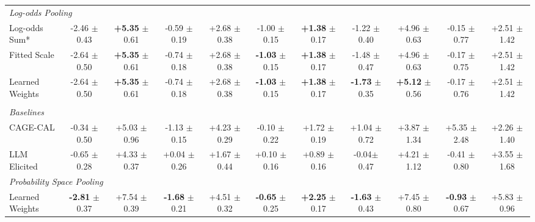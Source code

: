 \begin{table}[t]
\begin{threeparttable}
{\begin{tabular}{lcc|cc|cc|cc|cc}
\midrule
\multicolumn{11}{l}{\textit{Log-odds Pooling}}\\
Log-odds Sum* & -2.46 {\scriptsize $\pm$ 0.43} & \textbf{+5.35} {\scriptsize $\pm$ 0.61} & -0.59 {\scriptsize $\pm$ 0.19} & +2.68 {\scriptsize $\pm$ 0.38} & -1.00 {\scriptsize $\pm$ 0.15} & \textbf{+1.38} {\scriptsize $\pm$ 0.17} & -1.22 {\scriptsize $\pm$ 0.40} & +4.96 {\scriptsize $\pm$ 0.63} & -0.15 {\scriptsize $\pm$ 0.77} & +2.51 {\scriptsize $\pm$ 1.42} \\
Fitted Scale & -2.64 {\scriptsize $\pm$ 0.50} & \textbf{+5.35} {\scriptsize $\pm$ 0.61} & -0.74 {\scriptsize $\pm$ 0.18} & +2.68 {\scriptsize $\pm$ 0.38} & \textbf{-1.03} {\scriptsize $\pm$ 0.15} & \textbf{+1.38} {\scriptsize $\pm$ 0.17} & -1.48 {\scriptsize $\pm$ 0.47} & +4.96 {\scriptsize $\pm$ 0.63} & -0.17 {\scriptsize $\pm$ 0.75} & +2.51 {\scriptsize $\pm$ 1.42} \\
Learned Weights & -2.64 {\scriptsize $\pm$ 0.50} & \textbf{+5.35} {\scriptsize $\pm$ 0.61} & -0.74 {\scriptsize $\pm$ 0.18} & +2.68 {\scriptsize $\pm$ 0.38} & \textbf{-1.03} {\scriptsize $\pm$ 0.15} & \textbf{+1.38} {\scriptsize $\pm$ 0.17} & \textbf{-1.73} {\scriptsize $\pm$ 0.35} & \textbf{+5.12} {\scriptsize $\pm$ 0.56} & -0.17 {\scriptsize $\pm$ 0.76} & +2.51 {\scriptsize $\pm$ 1.42} \\

\midrule
\rowcolor{headergray}
\multicolumn{11}{c}{\textit{Post Interaction: Debate Round 1}}\\

\multicolumn{11}{l}{\textit{Baselines}}\\
CAGE-CAL & -0.34 {\scriptsize $\pm$ 0.50} & +5.03 {\scriptsize $\pm$ 0.96} & -1.13 {\scriptsize $\pm$ 0.15} & +4.23 {\scriptsize $\pm$ 0.29} & -0.10 {\scriptsize $\pm$ 0.22} & +1.72 {\scriptsize $\pm$ 0.19} & +1.04 {\scriptsize $\pm$ 0.72} & +3.87 {\scriptsize $\pm$ 1.34} & +5.35 {\scriptsize $\pm$ 2.48} & +2.26 {\scriptsize $\pm$ 1.40} \\
LLM Elicited & -0.65 {\scriptsize $\pm$ 0.28} & +4.33 {\scriptsize $\pm$ 0.37} & +0.04 {\scriptsize $\pm$ 0.26} & +1.67 {\scriptsize $\pm$ 0.44} & +0.10 {\scriptsize $\pm$ 0.16} & +0.89 {\scriptsize $\pm$ 0.16} & -0.04{\scriptsize $\pm$ 0.47} & +4.21 {\scriptsize $\pm$ 1.12} & -0.41 {\scriptsize $\pm$ 0.80} & +3.55 {\scriptsize $\pm$ 1.68} \\

\midrule
\multicolumn{11}{l}{\textit{Probability Space Pooling}}\\
Learned Weights & \textbf{-2.81} {\scriptsize $\pm$ 0.37} & +7.54 {\scriptsize $\pm$ 0.39} & \textbf{-1.68} {\scriptsize $\pm$ 0.21} & +4.51 {\scriptsize $\pm$ 0.32} & \textbf{-0.65} {\scriptsize $\pm$ 0.25} & \textbf{+2.25} {\scriptsize $\pm$ 0.17} & \textbf{-1.63} {\scriptsize $\pm$ 0.43} & +7.45 {\scriptsize $\pm$ 0.80} & \textbf{-0.93} {\scriptsize $\pm$ 0.67} & +5.83 {\scriptsize $\pm$ 0.96} \\


\end{tabular}}
\end{threeparttable}
\end{table}
